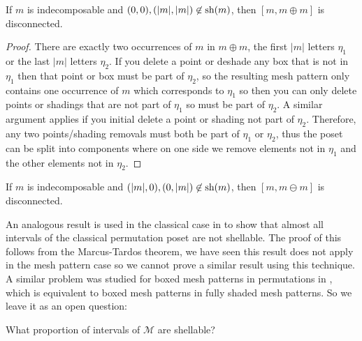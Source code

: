 \documentclass[11pt,a4paper,oneside]{article}
\begin{document}
\begin{lem}
If $m$ is indecomposable and $(0,0),(|m|,|m|)\not\in\operatorname{\textrm{sh}}(m)$, then
$[m,m\oplus m]$ is disconnected.
\begin{proof}
There are exactly two occurrences of $m$ in $m\oplus m$, the first $|m|$ letters
$\eta_1$ or the last $|m|$ letters $\eta_2$. If you delete a point or deshade
any box that is not in $\eta_1$ then that point or box must be part of $\eta_2$,
so the resulting mesh pattern only contains one occurrence of $m$ which
corresponds to $\eta_1$ so then you can only delete points or shadings that are
not part of $\eta_1$ so must be part of $\eta_2$. A similar argument applies if
you initial delete a point or shading not part of $\eta_2$. Therefore, any two
points/shading removals must both be part of $\eta_1$ or $\eta_2$, thus the
poset can be split into components where on one side we remove elements not in
$\eta_1$ and the other elements not in $\eta_2$.
\end{proof}
\end{lem}
\begin{cor}
If $m$ is indecomposable and $(|m|,0),(0,|m|)\not\in\operatorname{\textrm{sh}}(m)$, then
$[m,m\ominus m]$ is disconnected.
\end{cor}

An analogous result is used in the classical case in \cite{McSt13} to show that
almost all intervals of the classical permutation poset are not shellable. The
proof of this follows from the Marcus-Tardos theorem, we have seen this result
does not apply in the mesh pattern case so we cannot prove a similar result
using this technique.  A similar problem was studied for boxed mesh patterns in
permutations in \cite{AKV13}, which is equivalent to boxed mesh patterns in
fully shaded mesh patterns. So we leave it as an open question:

\begin{que}
What proportion of intervals of $\mathcal{M}$ are shellable?
\end{que}




\end{document}
